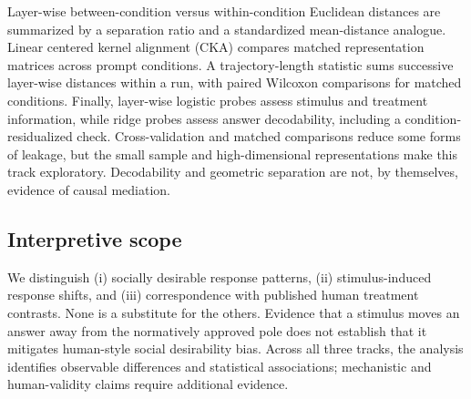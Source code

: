 Layer-wise between-condition versus within-condition Euclidean distances are summarized by a separation ratio and a standardized mean-distance analogue. Linear centered kernel alignment (CKA) compares matched representation matrices across prompt conditions. A trajectory-length statistic sums successive layer-wise distances within a run, with paired Wilcoxon comparisons for matched conditions. Finally, layer-wise logistic probes assess stimulus and treatment information, while ridge probes assess answer decodability, including a condition-residualized check. Cross-validation and matched comparisons reduce some forms of leakage, but the small sample and high-dimensional representations make this track exploratory. Decodability and geometric separation are not, by themselves, evidence of causal mediation.

\subsection{Interpretive scope}

We distinguish (i) socially desirable response patterns, (ii) stimulus-induced response shifts, and (iii) correspondence with published human treatment contrasts. None is a substitute for the others. Evidence that a stimulus moves an answer away from the normatively approved pole does not establish that it mitigates human-style social desirability bias. Across all three tracks, the analysis identifies observable differences and statistical associations; mechanistic and human-validity claims require additional evidence.

